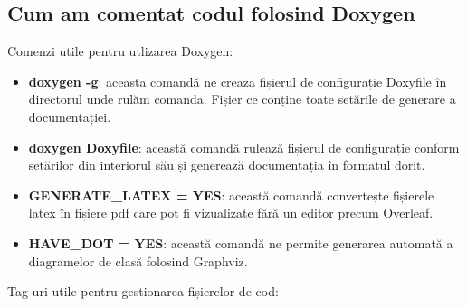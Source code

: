 \documentclass[runningheads]{llncs}
\begin{document}
\subsection{Cum am comentat codul folosind Doxygen}
Comenzi utile pentru utlizarea Doxygen:
\begin{itemize}
    \item \textbf{doxygen -g}: aceasta comandă ne creaza fișierul de configurație Doxyfile în directorul unde rulăm comanda. Fișier ce conține toate setările de generare a documentației.
    \item \textbf{doxygen Doxyfile}: această comandă rulează fișierul de configurație conform setărilor din interiorul său și generează documentația în formatul dorit.
    \item \textbf{GENERATE\_LATEX = YES}: această comandă convertește fișierele latex în fișiere pdf care pot fi vizualizate fără un editor precum Overleaf.
    \item \textbf{HAVE\_DOT = YES}: această comandă ne permite generarea automată a diagramelor de clasă folosind Graphviz.
\end{itemize}
Tag-uri utile pentru gestionarea fișierelor de cod:
\end{document}
